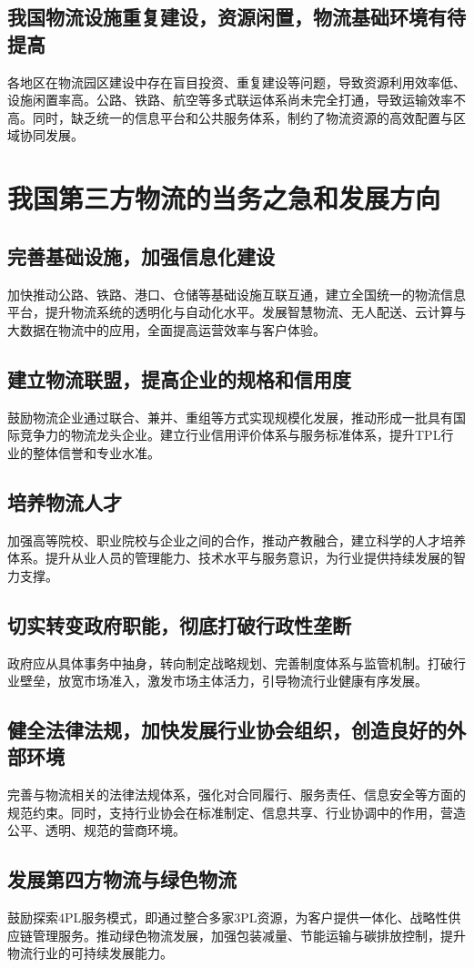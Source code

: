 \documentclass[UTF-8]{CUFEpaper}
\begin{document}
\subsection{我国物流设施重复建设，资源闲置，物流基础环境有待提高}
各地区在物流园区建设中存在盲目投资、重复建设等问题，导致资源利用效率低、设施闲置率高。公路、铁路、航空等多式联运体系尚未完全打通，导致运输效率不高。同时，缺乏统一的信息平台和公共服务体系，制约了物流资源的高效配置与区域协同发展。

\section{我国第三方物流的当务之急和发展方向}
\subsection{完善基础设施，加强信息化建设}
加快推动公路、铁路、港口、仓储等基础设施互联互通，建立全国统一的物流信息平台，提升物流系统的透明化与自动化水平。发展智慧物流、无人配送、云计算与大数据在物流中的应用，全面提高运营效率与客户体验。

\subsection{建立物流联盟，提高企业的规格和信用度}
鼓励物流企业通过联合、兼并、重组等方式实现规模化发展，推动形成一批具有国际竞争力的物流龙头企业。建立行业信用评价体系与服务标准体系，提升TPL行业的整体信誉和专业水准。

\subsection{培养物流人才}
加强高等院校、职业院校与企业之间的合作，推动产教融合，建立科学的人才培养体系。提升从业人员的管理能力、技术水平与服务意识，为行业提供持续发展的智力支撑。

\subsection{切实转变政府职能，彻底打破行政性垄断}
政府应从具体事务中抽身，转向制定战略规划、完善制度体系与监管机制。打破行业壁垒，放宽市场准入，激发市场主体活力，引导物流行业健康有序发展。

\subsection{健全法律法规，加快发展行业协会组织，创造良好的外部环境}
完善与物流相关的法律法规体系，强化对合同履行、服务责任、信息安全等方面的规范约束。同时，支持行业协会在标准制定、信息共享、行业协调中的作用，营造公平、透明、规范的营商环境。

\subsection{发展第四方物流与绿色物流}
鼓励探索4PL服务模式，即通过整合多家3PL资源，为客户提供一体化、战略性供应链管理服务。推动绿色物流发展，加强包装减量、节能运输与碳排放控制，提升物流行业的可持续发展能力。
\end{document}
